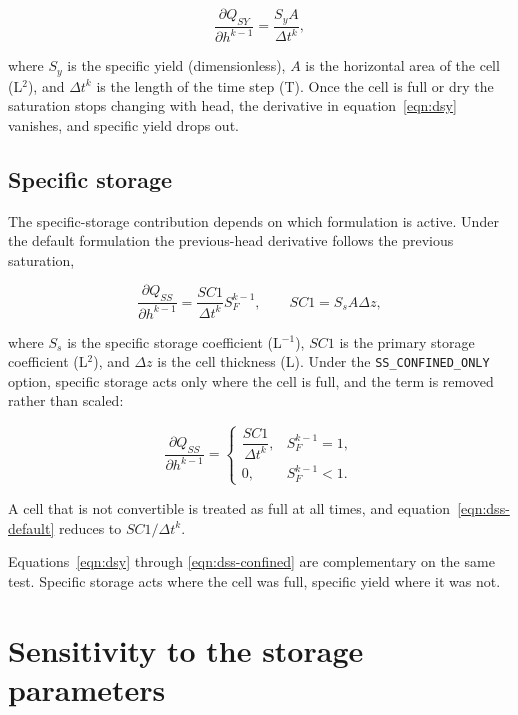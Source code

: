 \begin{equation}
	\label{eqn:dsy}
	\frac{\partial Q_{SY}}{\partial h^{k-1}} = \frac{S_y A}{\Delta t^{k}},
\end{equation}

\noindent where $S_y$ is the specific yield (dimensionless), $A$ is the horizontal area of the cell (L$^{2}$), and $\Delta t^{k}$ is the length of the time step (T). Once the cell is full or dry the saturation stops changing with head, the derivative in equation~\ref{eqn:dsy} vanishes, and specific yield drops out.

\subsection*{Specific storage}

The specific-storage contribution depends on which formulation is active. Under the default formulation the previous-head derivative follows the previous saturation,

\begin{equation}
	\label{eqn:dss-default}
	\frac{\partial Q_{SS}}{\partial h^{k-1}} =
	\frac{SC1}{\Delta t^{k}} S_F^{k-1}, \qquad SC1 = S_s A \Delta z,
\end{equation}

\noindent where $S_s$ is the specific storage coefficient (L$^{-1}$), $SC1$ is the primary storage coefficient (L$^{2}$), and $\Delta z$ is the cell thickness (L). Under the \texttt{SS\_CONFINED\_ONLY} option, specific storage acts only where the cell is full, and the term is removed rather than scaled:

\begin{equation}
	\label{eqn:dss-confined}
	\frac{\partial Q_{SS}}{\partial h^{k-1}} = \begin{cases}
		\dfrac{SC1}{\Delta t^{k}}, & S_F^{k-1} = 1, \\[2ex]
		0, & S_F^{k-1} < 1.
	\end{cases}
\end{equation}

A cell that is not convertible is treated as full at all times, and equation~\ref{eqn:dss-default} reduces to $SC1/\Delta t^{k}$.

Equations~\ref{eqn:dsy} through \ref{eqn:dss-confined} are complementary on the same test. Specific storage acts where the cell was full, specific yield where it was not.

\section*{Sensitivity to the storage parameters}

